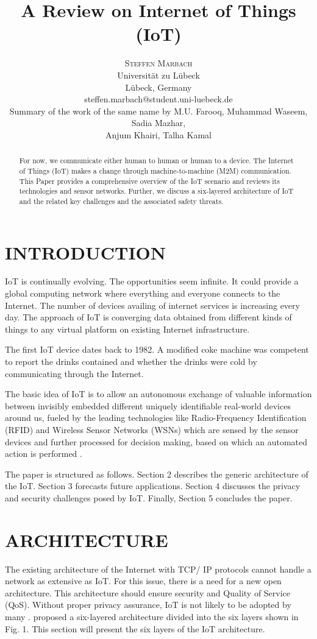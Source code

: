 \documentclass[twoside,twocolumn]{article}
\title{\textbf{A Review on Internet of Things (IoT)}}
\author{
    \textsc{Steffen Marbach} \\[1.5ex]
    \normalsize Universität zu Lübeck \\
    \normalsize Lübeck, Germany \\
    \normalsize steffen.marbach@student.uni-luebeck.de \\[1.5ex]
    \normalsize Summary of the work of the same name by M.U. Farooq, Muhammad Waseem, Sadia Mazhar,\\ 
    \normalsize Anjum Khairi, Talha Kamal \cite{AReViewOnInternetOfThings}
}
\date{}
\begin{document}
\maketitle

\begin{abstract}
   For now, we communicate either human to human or human to a device. The Internet of Things (IoT) makes a change through machine-to-machine (M2M) communication. This Paper provides a comprehensive overview of the IoT scenario and reviews its technologies and sensor networks. Further, we discuss a six-layered architecture of IoT and the related key challenges and the associated safety threats.
\end{abstract}

\section{INTRODUCTION}
    IoT is continually evolving. The opportunities seem infinite. It could provide a global computing network where everything and everyone connects to the Internet. The number of devices availing of internet services is increasing every day. The approach of IoT is converging data obtained from different kinds of things to any virtual platform on existing Internet infrastructure.

    The first IoT device dates back to 1982. A modified coke machine was competent to report the drinks contained and whether the drinks were cold by communicating through the Internet\cite{CokeMachine}.
    
    The basic idea of IoT is to allow an autonomous exchange of valuable information between invisibly embedded different uniquely identifiable real-world devices around us, fueled by the leading technologies like Radio-Frequency Identification (RFID) and Wireless Sensor Networks (WSNs) \cite{VisionsIoT} which are sensed by the sensor devices and further processed for decision making, based on which an automated action is performed \cite{FutureInternet}.
    
    The paper is structured as follows. Section 2 describes the generic architecture of the IoT. Section 3 forecasts future applications. Section 4 discusses the privacy and security challenges posed by IoT. Finally, Section 5 concludes the paper.

\section{ARCHITECTURE}
    The existing architecture of the Internet with TCP/ IP protocols cannot handle a network as extensive as IoT. For this issue, there is a need for a new open architecture. This architecture should ensure security and Quality of Service (QoS). Without proper privacy assurance, IoT is not likely to be adopted by many \cite{SecurityIoT}. \cite{ArchitectureIoT} proposed a six-layered architecture divided into the six layers shown in Fig. 1.
    This section will present the six layers of the IoT architecture.
    
\end{document}

